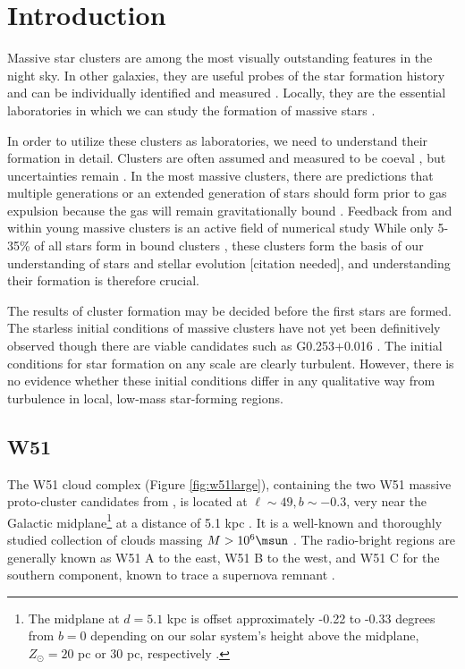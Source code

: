 \section{Introduction}

Massive star clusters are among the most visually outstanding features in the
night sky.  In other galaxies, they are useful probes of the star formation history
and can be individually identified and measured \citep{Bastian2008a}.  Locally,
they are the essential laboratories in which we can study the formation of massive
stars \citep{Davies2012a}.

In order to utilize these clusters as laboratories, we need to understand their
formation in detail.  Clusters are often assumed and measured to be coeval
\citep[e.g.][]{Kudryavtseva2012a}, but uncertainties remain \citep{Beccari2010a}.
In the most massive clusters, there are predictions that multiple generations
or an extended generation of stars should form prior to gas expulsion because
the gas will remain gravitationally bound \citep{Bressert2012a}.   Feedback from
and within young massive clusters is an active field of numerical study
\citep{Rogers2013a,Dale2013a,Dale2012a,Dale2008a,Dale2005a,Parker2013a,Myers2014a,Krumholz2014a}
While
only 5-35\% of all stars form in bound clusters \citep{Kruijssen2012a},
these clusters form the basis of our understanding of stars and stellar evolution
[citation needed], and understanding their formation is therefore crucial.

The results of cluster formation may be decided before the first stars are
formed.  The starless initial conditions of massive clusters have not yet been
definitively observed \citep{Ginsburg2012a} though there are viable candidates
such as G0.253+0.016 \citep{Longmore2012b}.  The initial conditions for star
formation on any scale are clearly turbulent.  However, there is no evidence
whether these initial conditions differ in any qualitative way from turbulence
in local, low-mass star-forming regions.

\subsection{W51}
The W51 cloud complex (Figure \ref{fig:w51large}), containing the two W51
massive proto-cluster candidates from \citep{Ginsburg2012a}, is located at
$\ell\sim49, b\sim-0.3$, very near the Galactic midplane\footnote{The midplane
at $d=5.1$ kpc is offset approximately -0.22 to -0.33 degrees from $b=0$
depending on our solar system's height above the midplane, $Z_\odot = 20$ pc or
30 pc, respectively \citep{Reed2006a,Joshi2007a}.} at a distance of 5.1 kpc
\citep{Sato2010a}.  It is a well-known and thoroughly studied collection of
clouds massing $M>10^6 \msun$
\citep{Carpenter1998a,Bieging2010a,Kang2010a,Parsons2012a}.  The radio-bright
regions are generally known as W51 A to the east, W51 B to the west, and W51 C
for the southern component, known to trace a supernova remnant
\citep{Koo1995a,Brogan2000a,Brogan2013a}.

